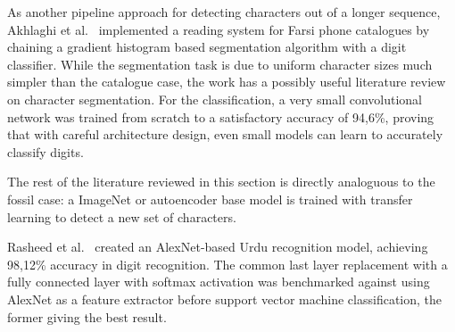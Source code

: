 \documentclass[english,twoside,openright]{UH_DS_MSc}
\begin{document}

As another pipeline approach for detecting characters out of a longer sequence, Akhlaghi et al.~\cite{1akhlaghiFarsi} implemented 
a reading system for Farsi phone catalogues by chaining a gradient histogram based segmentation 
algorithm with a digit classifier. While the segmentation task is due to uniform character
 sizes much simpler than the catalogue case, the work has a possibly useful literature review on
  character segmentation. For the classification, a very small convolutional network was trained
   from scratch to a satisfactory accuracy of 94,6\%, proving that with careful architecture design,
    even small models can learn to accurately classify digits.


The rest of the literature reviewed in this section is directly analoguous 
to the fossil case: a ImageNet or autoencoder base model is trained with transfer learning to detect a new set of characters.



Rasheed et al.~\cite{5rasheedHandwrittenUrduWAlexNet} created an AlexNet-based Urdu recognition 
model, achieving 98,12\% accuracy in digit recognition. The common last layer replacement 
with a fully connected layer with softmax activation was benchmarked against using AlexNet as 
a feature extractor before support vector 
machine classification, the former giving the best result.


\end{document}
